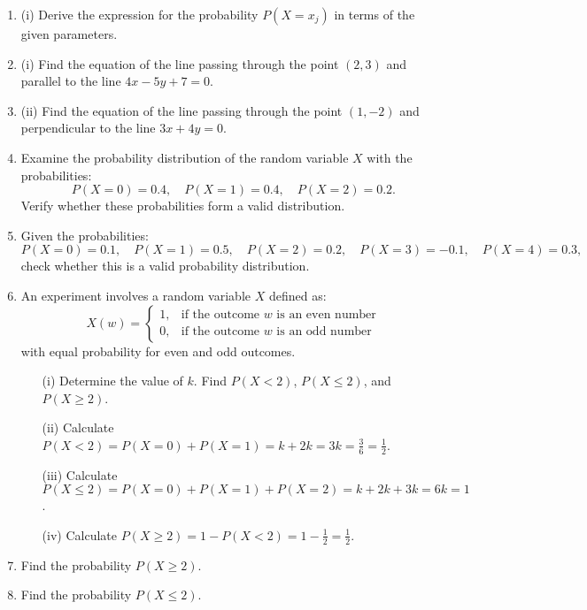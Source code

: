 \documentclass{article}
\begin{document}
\begin{enumerate}
    \item (i) Derive the expression for the probability \(P(X = x_j)\) in terms of the given parameters.
    
    \item (i) Find the equation of the line passing through the point \((2,3)\) and parallel to the line \(4x - 5y + 7 = 0\).
    
    \item (ii) Find the equation of the line passing through the point \((1, -2)\) and perpendicular to the line \(3x + 4y = 0\).
    
    \item Examine the probability distribution of the random variable \(X\) with the probabilities:
    \[
    P(X=0) = 0.4, \quad P(X=1) = 0.4, \quad P(X=2) = 0.2.
    \]
    Verify whether these probabilities form a valid distribution.
    
    \item Given the probabilities:
    \[
    P(X=0) = 0.1, \quad P(X=1) = 0.5, \quad P(X=2) = 0.2, \quad P(X=3) = -0.1, \quad P(X=4) = 0.3,
    \]
    check whether this is a valid probability distribution.
    
    \item An experiment involves a random variable \(X\) defined as:
    \[
    X(w) = \begin{cases}
    1, & \text{if the outcome } w \text{ is an even number} \\
    0, & \text{if the outcome } w \text{ is an odd number}
    \end{cases}
    \]
    with equal probability for even and odd outcomes.
    
    \begin{itemize}
        \item[(i)] Determine the value of \(k\). Find \(P(X < 2)\), \(P(X \leq 2)\), and \(P(X \geq 2)\).
        \item[(ii)] Calculate \(P(X < 2) = P(X=0) + P(X=1) = k + 2k = 3k = \frac{3}{6} = \frac{1}{2}\).
        \item[(iii)] Calculate \(P(X \leq 2) = P(X=0) + P(X=1) + P(X=2) = k + 2k + 3k = 6k = 1\).
        \item[(iv)] Calculate \(P(X \geq 2) = 1 - P(X < 2) = 1 - \frac{1}{2} = \frac{1}{2}\).
    \end{itemize}
    
    \item Find the probability \(P(X \geq 2)\).
    
    \item Find the probability \(P(X \leq 2)\).
    

\end{enumerate}
\end{document}
